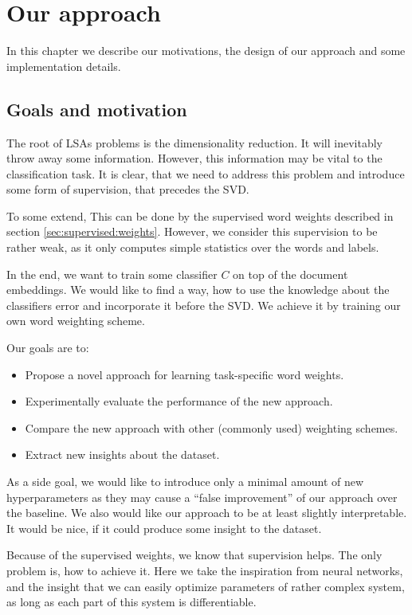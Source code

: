 \chapter{Our approach}

In this chapter we describe our motivations, the design of our approach and some implementation details.

\section{Goals and motivation}

    The root of LSAs problems is the dimensionality reduction.
    It will inevitably throw away some information. 
    However, this information may be vital to the classification task. 
    It is clear, that we need to address this problem and introduce some form of supervision, that precedes the SVD.
    
    To some extend, This can be done by the supervised word weights described in section \ref{sec:supervised:weights}.
    However, we consider this supervision to be rather weak, as it only computes simple statistics over the words and labels.
    
    In the end, we want to train some classifier $C$ on top of the document embeddings.
    We would like to find a way, how to use the knowledge about the classifiers error and incorporate it before the SVD.
    We achieve it by training our own word weighting scheme. 
    
    Our goals are to:
    \begin{itemize}
        \item Propose a novel approach for learning task-specific word weights.
        \item Experimentally evaluate the performance of the new approach.
        \item Compare the new approach with other (commonly used) weighting schemes. 
        \item Extract new insights about the dataset.
    \end{itemize}
    
    As a side goal, we would like to introduce only a minimal amount of new hyperparameters
    as they may cause a ``false improvement'' of our approach over the baseline.
    We also would like our approach to be at least slightly interpretable.
    It would be nice, if it could produce some insight to the dataset.
    
    Because of the supervised weights, we know that supervision helps. 
    The only problem is, how to achieve it. 
    Here we take the inspiration from neural networks, and the insight that we can easily optimize parameters of rather complex system, as long as each part of this system is differentiable. 

